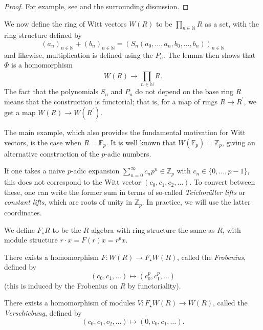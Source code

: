 \begin{proof}
    For example, see \cite[Theorem~2.6]{rabinoff-2014-witt-vec} and the
	surrounding discussion.
\end{proof}

We now define the ring of Witt vectors
\(W(R)\) to be
\(\prod_{n \in \mathbb{N}}^{} R \)
as a set, with the ring structure defined
by
\[
	(a_{n})_{n \in \mathbb{N}} +
	(b_{n})_{n \in \mathbb{N}} =
	(S_{n}(a_{0}, \ldots, a_{n}, b_{0}, \ldots, b_{n}))_{n \in \mathbb{N}}
\]
and likewise, multiplication is defined
using the \(P_{n}\).
The lemma then shows that \(\Phi\) is a homomorphism
\[
	W(R) \xrightarrow{} \prod_{n \in \mathbb{N}}^{} R
.\]
The fact that the polynomials \(S_{n}\) and \(P_{n}\) do not depend on the base
ring \(R\) means that the construction is functorial; that is,
for a map of rings \(R \xrightarrow{} R^{\prime} \), we get a
map \(W(R) \xrightarrow{} W(R^{\prime})\).

The main example, which also provides the fundamental motivation
for Witt vectors, is the case when \(R = \mathbb{F}_{p}\).
It is well known that \(W(\mathbb{F}_{p}) = \mathbb{Z}_{p}\),
giving an alternative construction of the \(p\)-adic numbers.

\begin{warn}
	If one takes a
    naive \(p\)-adic expansion 
    \(\sum_{n = 0}^{\infty} c_{n}p^{n} \in \mathbb{Z}_{p}\)
    with \(c_{n} \in \{0, \ldots, p-1\}\), this does not correspond
    to the Witt vector \((c_{0}, c_{1}, c_{2}, \ldots)\).
    To convert between these, one can write the former sum in terms of
    so-called \textit{Teichm\"uller lifts} or \textit{constant lifts},
    which are roots of unity in \(\mathbb Z_p\). In practice, we will use
    the latter coordinates.
\end{warn}

We define \(F_{\star}R\) to be the \(R\)-algebra with ring structure
the same as \(R\), with module structure \(r \cdot x = F(r)x = r^{p}x\).

\begin{defn}
    \label{def:witt:frob}
	There exists a homomorphism \(F \colon W(R) \xrightarrow{} F_{\star}W(R)\),
	called the \textit{Frobenius},
	defined by
	\[
	 (c_{0}, c_{1}, \ldots) \mapsto (c_{0}^{p}, c_{1}^{p}, \ldots)
	\]
    (this is induced by the Frobenius on \(R\) by functoriality).
\end{defn}

\begin{defn}
	There exists a homomorphism of modules \(V \colon F_{\star}W(R) \xrightarrow{} W(R)\),
	called the \textit{Verschiebung},
	defined by
	\[
		(c_{0}, c_{1}, c_{2}, \ldots) \mapsto  (0, c_{0}, c_{1}, \ldots)
	.\]
\end{defn}

